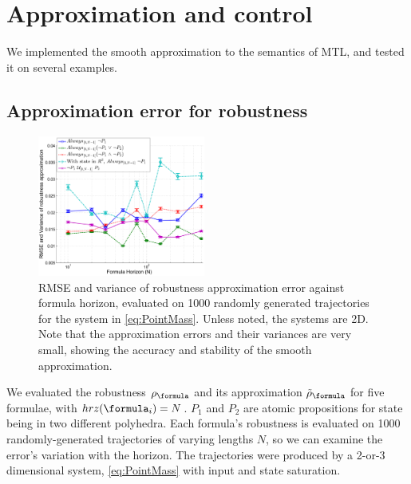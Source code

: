 \section{Approximation and control}
\label{sec:examples}
We implemented the smooth approximation to the semantics of MTL, and tested it on several examples.

\subsection{Approximation error for robustness}
\label{sec: ex apx error}
\begin{figure}[t]
\centering
\includegraphics[width=0.49\textwidth]{figures/RobustnessError_corrected_scissored}
\vspace{-20pt}
\caption{{\small RMSE and variance of robustness approximation error against formula horizon, evaluated on 1000 randomly generated trajectories for the system in \eqref{eq:PointMass}. Unless noted, the systems are 2D. Note that the approximation errors and their variances are very small, showing the accuracy and stability of the smooth approximation.}}
\vspace{-10pt}
\label{fig:sample result}
\end{figure}

We evaluated the robustness $\robf$ and its approximation $\srobf$ for five formulae, with $hrz(\formula_i) = N$. $P_1$ and $P_2$ are atomic propositions for state being in two different polyhedra.
Each formula's robustness is evaluated on 1000 randomly-generated trajectories of varying lengths $N$, so we can  examine the error's variation with the horizon.
The trajectories were produced by a 2-or-3 dimensional system, \eqref{eq:PointMass} with input and state saturation.

